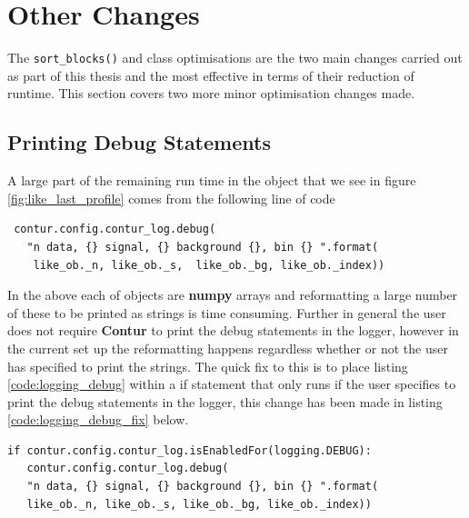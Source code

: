 \section{Other Changes}\label{sec:other_changes}
The \texttt{sort\_blocks()} and  class optimisations are the two main changes carried out as part of this thesis and the most effective in terms of their reduction of runtime. This section covers two more minor optimisation changes made.

\subsection{Printing Debug Statements}
A large part of the remaining run time in the  object that we see in figure \ref{fig:like_last_profile} comes from the following line of code

\begin{code}
\label{code:logging_debug}
\begin{verbatim}
 contur.config.contur_log.debug(
   "n data, {} signal, {} background {}, bin {} ".format(
    like_ob._n, like_ob._s,  like_ob._bg, like_ob._index))
\end{verbatim}
\end{code}

In the above each of  objects are \textbf{numpy} arrays and reformatting a large number of these to be printed as strings is time consuming. Further in general the user does not require \textbf{Contur} to print the debug statements in the logger, however in the current set up the reformatting happens regardless whether or not the user has specified to print the strings. The quick fix to this is to place listing \ref{code:logging_debug} within a if statement that only runs if the user specifies to print the debug statements in the logger, this change has been made in listing \ref{code:logging_debug_fix} below.

\begin{code}
\label{code:logging_debug_fix}
\begin{verbatim}
if contur.config.contur_log.isEnabledFor(logging.DEBUG):
   contur.config.contur_log.debug(
   "n data, {} signal, {} background {}, bin {} ".format(
   like_ob._n, like_ob._s, like_ob._bg, like_ob._index))
\end{verbatim}
\end{code}

